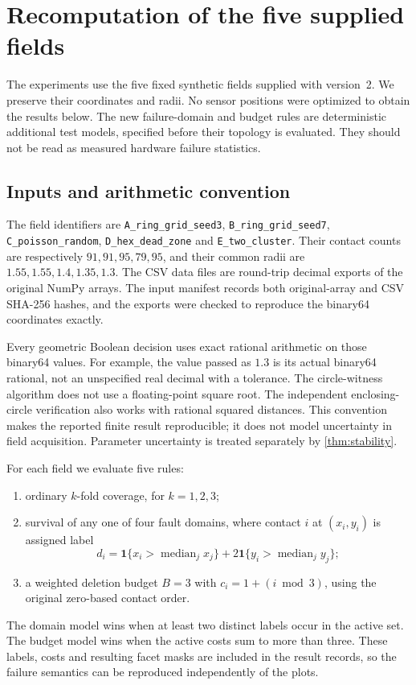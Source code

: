 \section{Recomputation of the five supplied fields}
\label{sec:experiments}
The experiments use the five fixed synthetic fields supplied with version~2. We preserve their coordinates and radii. No sensor positions were optimized to obtain the results below. The new failure-domain and budget rules are deterministic additional test models, specified before their topology is evaluated. They should not be read as measured hardware failure statistics.

\subsection{Inputs and arithmetic convention}
The field identifiers are \texttt{A\_ring\_grid\_seed3}, \texttt{B\_ring\_grid\_seed7}, \texttt{C\_poisson\_random}, \texttt{D\_hex\_dead\_zone} and \texttt{E\_two\_cluster}. Their contact counts are respectively $91,91,95,79,95$, and their common radii are $1.55,1.55,1.4,1.35,1.3$. The CSV data files are round-trip decimal exports of the original NumPy arrays. The input manifest records both original-array and CSV SHA-256 hashes, and the exports were checked to reproduce the binary64 coordinates exactly.

Every geometric Boolean decision uses exact rational arithmetic on those binary64 values. For example, the value passed as $1.3$ is its actual binary64 rational, not an unspecified real decimal with a tolerance. The circle-witness algorithm does not use a floating-point square root. The independent enclosing-circle verification also works with rational squared distances. This convention makes the reported finite result reproducible; it does not model uncertainty in field acquisition. Parameter uncertainty is treated separately by \cref{thm:stability}.

For each field we evaluate five rules:
\begin{enumerate}
\item ordinary $k$-fold coverage, for $k=1,2,3$;
\item survival of any one of four fault domains, where contact $i$ at $(x_i,y_i)$ is assigned label
\begin{equation}\label{eq:domain-assignment}
d_i=\boldsymbol1\{x_i>\operatorname{median}_j x_j\}
+2\boldsymbol1\{y_i>\operatorname{median}_j y_j\};
\end{equation}
\item a weighted deletion budget $B=3$ with $c_i=1+(i\bmod3)$, using the original zero-based contact order.
\end{enumerate}
The domain model wins when at least two distinct labels occur in the active set. The budget model wins when the active costs sum to more than three. These labels, costs and resulting facet masks are included in the result records, so the failure semantics can be reproduced independently of the plots.

